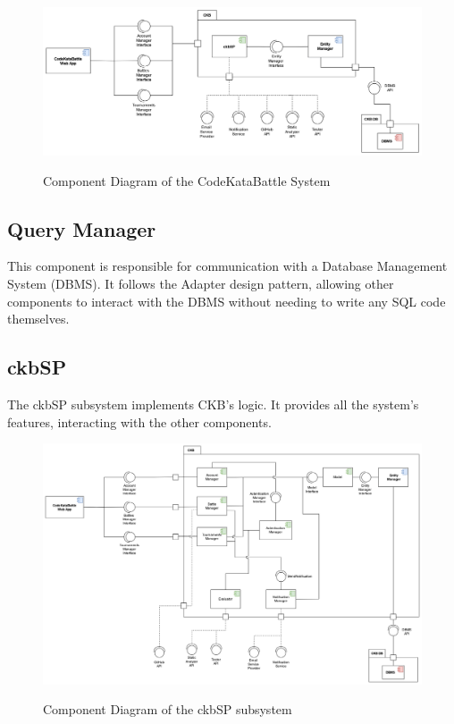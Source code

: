 \documentclass{Configuration_Files/Template}
\begin{document}
\begin{figure}[H]
\centering
\includegraphics[scale = 0.6]{DD_latex/Images/diagrams/Component_view.png}\\
\caption{Component Diagram of the CodeKataBattle System}
\end{figure}

\subsection{Query Manager}

This component is responsible for communication with a Database Management System (DBMS). It follows the Adapter design pattern, allowing other components to interact with the DBMS without needing to write any SQL code themselves.

\subsection{ckbSP}

The ckbSP subsystem implements CKB's logic. It provides all the system's features, interacting with the other components.

\begin{figure}[H]
\centering
\includegraphics[scale = 0.6]{DD_latex/Images/diagrams/ComponentViewCKBSP.png}\\
\caption{Component Diagram of the ckbSP subsystem}
\end{figure}
\end{document}
